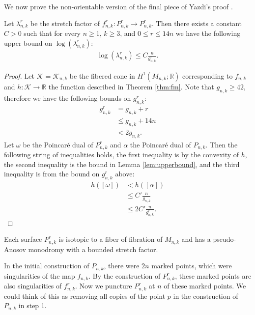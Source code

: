 We now prove the non-orientable version of the final piece of Yazdi's proof \cite[Lemma 3.6]{yazdi2018pseudo}.
\begin{lem}
\label{lem:bound}
Let $\lambda_{n,k}^r$ be the stretch factor of $f_{n,k}^r:P_{n,k}^r\rightarrow P_{n,k}^r$. Then there exists a constant $C > 0$ such that for every $n \geq 1$, $k \geq 3$, and $0 \leq r \leq 14n$ we have the following upper bound on $\log(\lambda_{n,k}^r)$:
\begin{align*}
  \log(\lambda^r_{n,k}) \leq C\frac{n}{g^r_{n,k}}.
\end{align*}
\end{lem}
\begin{proof}
  Let $\mathcal{K} = \mathcal{K}_{n,k}$ be the fibered cone in $H^1(M_{n,k};\mathbb{R})$ corresponding to $f_{n,k}$ and $h: \mathcal{K} \xrightarrow[]{} \mathbb{R}$
  the function described in Theorem \ref{thm:fm}. Note that $g_{n,k}\geq 42$, therefore we have the following bounds on $g_{n,k}^r$:
  \begin{align*}
    g^r_{n,k} &= g_{n,k} + r \\
              &\leq g_{n,k} + 14n \\
              &< 2g_{n,k}.
  \end{align*}
  Let $\omega$ be the Poincar\'e dual of $P^r_{n,k}$ and $\alpha$ the Poincar\'e dual of $P_{n,k}$.  Then the following string of inequalities holds, the first inequality is by the convexity of $h$, the second inequality is the bound in Lemma \ref{lem:upperbound}, and the third inequality is from the bound on $g^r_{n,k}$ above:
  \begin{align*}
    h([\omega]) &< h([\alpha]) \\
                &\leq C'\frac{n}{g_{n,k}} \\
                &\leq 2C'\frac{n}{g^r_{n,k}}. 
  \end{align*}
\end{proof}

Each surface $P^r_{n,k}$ is isotopic to a fiber of fibration of $M_{n,k}$ and has a pseudo-Anosov monodromy with a bounded stretch factor.

In the initial construction of $P_{n,k}$, there were $2n$  marked points, which were singularities of the map $f_{n,k}$.  By the construction of $P_{n,k}^r$, these marked points are also singularities of $f^r_{n,k}$.  Now we puncture $P_{n,k}^r$ at $n$ of these marked points.  We could think of this as removing all copies of the point $p$ in the construction of $P_{n,k}$ in step 1. %

